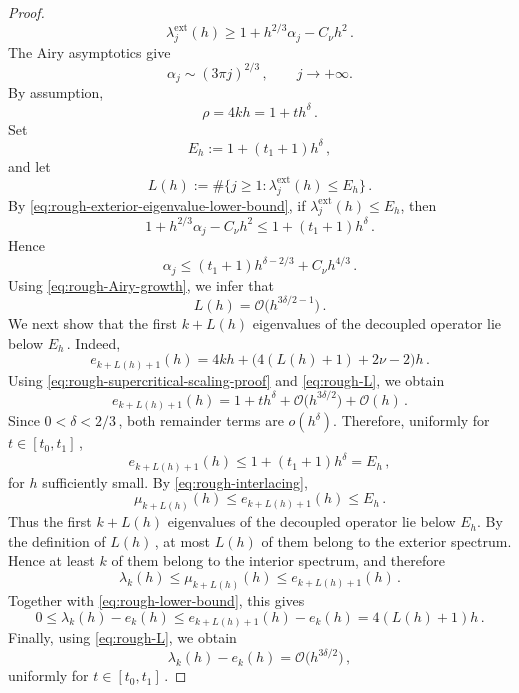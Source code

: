 \documentclass[10pt,a4paper]{amsart}
\theoremstyle{plain}
\theoremstyle{remark}
\begin{document}
\begin{proof}
\begin{equation}
		\lambda_j^{\mathrm{ext}}(h)
		\geq
		1+h^{2/3}\alpha_j-C_\nu h^2\,.
	\end{equation}
	The Airy asymptotics give
	\begin{equation}\label{eq:rough-Airy-growth}
		\alpha_j\sim(3\pi j)^{2/3}\,,
		\qquad j\to+\infty.
	\end{equation}
	By assumption,
	\begin{equation}\label{eq:rough-supercritical-scaling-proof}
		\rho=4kh=1+th^\delta\,.
	\end{equation}
	Set
	\[
	E_h:=1+(t_1+1)h^\delta\,,
	\]
	and let
	\[
	L(h)
	:=
	\#\bigl\{j\geq1:
	\lambda_j^{\mathrm{ext}}(h)\leq E_h\bigr\}\,.
	\]
	By \eqref{eq:rough-exterior-eigenvalue-lower-bound}, if
	$\lambda_j^{\mathrm{ext}}(h)\leq E_h$, then
	\[
	1+h^{2/3}\alpha_j-C_\nu h^2
	\leq
	1+(t_1+1)h^\delta\,.
	\]
	Hence
	\[
	\alpha_j
	\leq
	(t_1+1)h^{\delta-2/3}
	+C_\nu h^{4/3}\,.
	\]
	Using \eqref{eq:rough-Airy-growth}, we infer that
	\begin{equation}\label{eq:rough-L}
		L(h)
		=
		\mathcal O\bigl(h^{3\delta/2-1}\bigr)\,.
	\end{equation}
	We next show that the first $k+L(h)$ eigenvalues of the
	decoupled operator lie below $E_h\,$. Indeed,
	\[
	e_{k+L(h)+1}(h)
	=
	4kh+
	\bigl(4(L(h)+1)+2\nu-2\bigr)h\,.
	\]
	Using \eqref{eq:rough-supercritical-scaling-proof} and
	\eqref{eq:rough-L}, we obtain
	\[
	e_{k+L(h)+1}(h)
	=
	1+th^\delta
	+\mathcal O\bigl(h^{3\delta/2}\bigr)
	+\mathcal O(h)\,.
	\]
	Since $0<\delta<2/3\,$, both remainder terms are $o(h^\delta)$.
	Therefore, uniformly for $t\in[t_0,t_1]\,$,
	\[
	e_{k+L(h)+1}(h)
	\leq
	1+(t_1+1)h^\delta
	=E_h\,,
	\]
	for $h$ sufficiently small. By \eqref{eq:rough-interlacing},
	\[
	\mu_{k+L(h)}(h)
	\leq
	e_{k+L(h)+1}(h)
	\leq E_h\,.
	\]
	Thus the first $k+L(h)$ eigenvalues of the decoupled operator lie
	below $E_h$. By the definition of $L(h)\,$, at most $L(h)$ of them
	belong to the exterior spectrum. Hence at least $k$ of them belong
	to the interior spectrum, and therefore
	\[
	\lambda_k(h)
	\leq
	\mu_{k+L(h)}(h)
	\leq
	e_{k+L(h)+1}(h)\,.
	\]
	Together with \eqref{eq:rough-lower-bound}, this gives
	\[
	0\leq\lambda_k(h)-e_k(h)
	\leq
	e_{k+L(h)+1}(h)-e_k(h)
	=
	4(L(h)+1)h\,.
	\]
	Finally, using \eqref{eq:rough-L}, we obtain
	\[
	\lambda_k(h)-e_k(h)
	=
	\mathcal O\bigl(h^{3\delta/2}\bigr)\,,
	\]
	uniformly for $t\in[t_0,t_1]\,$.
\end{proof}
\end{document}
